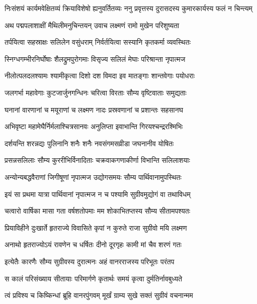 \fourlineindentedshloka
{निःसंशयं कार्यमवेक्षितव्यं}
{ क्रियाविशेषो ह्यनुवर्तितव्यः}
{ननु प्रवृत्तस्य दुरासदस्य}
{ कुमारकार्यस्य फलं न चिन्त्यम्} %

\twolineshloka
{अथ पद्मपलाशाक्षीं मैथिलीमनुचिन्तयन्}
{उवाच लक्ष्मणं रामो मुखेन परिशुष्यता} %

\twolineshloka
{तर्पयित्वा सहस्राक्षः सलिलेन वसुंधराम्}
{निर्वर्तयित्वा सस्यानि कृतकर्मा व्यवस्थितः} %

\twolineshloka
{स्निग्धगम्भीरनिर्घोषाः शैलद्रुमपुरोगमाः}
{विसृज्य सलिलं मेघाः परिश्रान्ता नृपात्मज} %

\twolineshloka
{नीलोत्पलदलश्यामः श्यामीकृत्वा दिशो दश}
{विमदा इव मातङ्गाः शान्तवेगाः पयोधराः} %

\twolineshloka
{जलगर्भा महावेगाः कुटजार्जुनगन्धिनः}
{चरित्वा विरताः सौम्य वृष्टिवाताः समुद्यताः} %

\twolineshloka
{घनानां वारणानां च मयूराणां च लक्ष्मण}
{नादः प्रस्रवणानां च प्रशान्तः सहसानघ} %

\twolineshloka
{अभिवृष्टा महामेघैर्निर्मलाश्चित्रसानवः}
{अनुलिप्ता इवाभान्ति गिरयश्चन्द्ररश्मिभिः} %

\twolineshloka
{दर्शयन्ति शरन्नद्यः पुलिनानि शनैः शनैः}
{नवसंगमसव्रीडा जघनानीव योषितः} %

\twolineshloka
{प्रसन्नसलिलाः सौम्य कुररीभिर्विनादिताः}
{चक्रवाकगणाकीर्णा विभान्ति सलिलाशयाः} %

\twolineshloka
{अन्योन्यबद्धवैराणां जिगीषूणां नृपात्मज}
{उद्योगसमयः सौम्य पार्थिवानामुपस्थितः} %

\twolineshloka
{इयं सा प्रथमा यात्रा पार्थिवानां नृपात्मज}
{न च पश्यामि सुग्रीवमुद्योगं वा तथाविधम्} %

\twolineshloka
{चत्वारो वार्षिका मासा गता वर्षशतोपमाः}
{मम शोकाभितप्तस्य सौम्य सीतामपश्यतः} %

\twolineshloka
{प्रियाविहीने दुःखार्ते हृतराज्ये विवासिते}
{कृपां न कुरुते राजा सुग्रीवो मयि लक्ष्मण} %

\twolineshloka
{अनाथो हृतराज्योऽयं रावणेन च धर्षितः}
{दीनो दूरगृहः कामी मां चैव शरणं गतः} %

\twolineshloka
{इत्येतैः कारणैः सौम्य सुग्रीवस्य दुरात्मनः}
{अहं वानरराजस्य परिभूतः परंतप} %

\twolineshloka
{स कालं परिसंख्याय सीतायाः परिमार्गणे}
{कृतार्थः समयं कृत्वा दुर्मतिर्नावबुध्यते} %

\twolineshloka
{त्वं प्रविश्य च किष्किन्धां ब्रूहि वानरपुंगवम्}
{मूर्खं ग्राम्य सुखे सक्तं सुग्रीवं वचनान्मम} %

